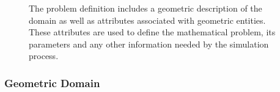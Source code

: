 \begin{figure}
\begin{center}
\caption{The problem definition includes a geometric description of the domain
as well as attributes associated with geometric entities.  These attributes
are used to define the mathematical problem, its parameters and any other 
information needed by the simulation process.}
\label{fig:probDef}
\end{center}
\end{figure}





\subsubsection{Geometric Domain}



